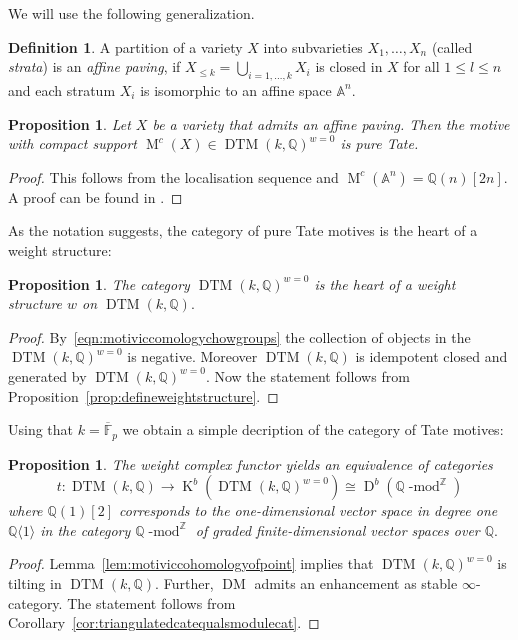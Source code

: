 \documentclass{amsart}
\theoremstyle{plain}
\newtheorem{proposition}[theorem]{Proposition}
\theoremstyle{TheoremNum}
\theoremstyle{definition}
\newtheorem{definition}[theorem]{Definition}
\theoremstyle{remark}
\numberwithin{equation}{section}
\newcommand{\A}{\mathbb{A}}
\newcommand{\Q}{\mathbb{Q}}
\newcommand{\Z}{\mathbb{Z}}
\newcommand{\Mot}{\operatorname{M}}
\newcommand{\D}{\operatorname{D}}
\newcommand{\DM}{\operatorname{DM}}
\newcommand{\DTM}{\operatorname{DTM}}
\newcommand{\K}{\operatorname{K}}
\begin{document}
We will use the following generalization.
\begin{definition}
A partition of a variety $X$ into subvarieties $X_1,\dots, X_n$ (called \emph{strata}) is an \emph{affine paving}, if $X
_{\leq k}=\bigcup_{i=1,\dots,k}X_i$
is closed in $X$ for all $1\leq l \leq n$ and each stratum $X_i$ is isomorphic to an affine space $\mathbb{A}^n.$
\end{definition}
\begin{proposition}\label{prop:affinepavingpuretate} Let $X$ be a variety that admits an affine paving. Then the motive with compact support
$\Mot^c(X)\in \DTM(k, \Q)^{w=0}$
is pure Tate.
\end{proposition}
\begin{proof}
This follows from the localisation sequence and $\Mot^c(\A^n)=\Q(n)[2n].$ A proof can be found in \cite[Lemma 2.3(10)]{eberhardt_springer_2021}.
\end{proof}
As the notation suggests, the category of pure Tate motives is the heart of a weight structure:
\begin{proposition}
The category $\DTM(k,\Q)^{w=0}$ is the heart of a weight structure $w$ on $\DTM(k,\Q).$
\end{proposition}
\begin{proof}
By~\eqref{eqn:motiviccomologychowgroups} the collection of objects in the $\DTM(k,\Q)^{w=0}$ is negative. Moreover $\DTM(k,\Q)$ is idempotent closed and generated by $\DTM(k,\Q)^{w=0}$. Now the  statement follows from Proposition~\ref{prop:defineweightstructure}.
\end{proof}
Using that $k=\overline{\mathbb{F}}_p$ we obtain a simple decription of the category of Tate motives:
\begin{proposition}
The weight complex functor yields an equivalence of categories
$$t:\DTM(k,\Q)\to\K^b(\DTM(k,\Q)^{w=0})\cong\D^b(\Q\operatorname{-mod}^\Z)$$
where $\Q(1)[2]$ corresponds to the one-dimensional vector space in degree one $\Q\langle 1\rangle$ in the category $\Q\operatorname{-mod}^\Z$ of graded finite-dimensional vector spaces over $\Q.$
\end{proposition}
\begin{proof}
Lemma~\ref{lem:motiviccohomologyofpoint} implies that $\DTM(k,\Q)^{w=0}$ is tilting in $\DTM(k,\Q).$ Further, $\DM$ admits an enhancement as stable $\infty$-category. The statement follows from Corollary~\ref{cor:triangulatedcatequalsmodulecat}.
\end{proof}
\end{document}

